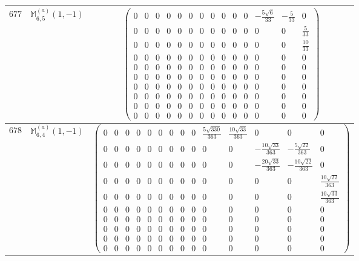 \documentclass[fleqn,8pt,landscape]{jsarticle}
\begin{document}
\begin{center}
\begin{longtable}{ccc}
$ 677 $ & $ \mathbb{M}_{6,5}^{(a)}(1,-1) $ & $ \begin{pmatrix} 0 & 0 & 0 & 0 & 0 & 0 & 0 & 0 & 0 & 0 & 0 & - \frac{5 \sqrt{6}}{33} & - \frac{5}{33} & 0 \\ 0 & 0 & 0 & 0 & 0 & 0 & 0 & 0 & 0 & 0 & 0 & 0 & 0 & \frac{5}{33} \\ 0 & 0 & 0 & 0 & 0 & 0 & 0 & 0 & 0 & 0 & 0 & 0 & 0 & \frac{10}{33} \\ 0 & 0 & 0 & 0 & 0 & 0 & 0 & 0 & 0 & 0 & 0 & 0 & 0 & 0 \\ 0 & 0 & 0 & 0 & 0 & 0 & 0 & 0 & 0 & 0 & 0 & 0 & 0 & 0 \\ 0 & 0 & 0 & 0 & 0 & 0 & 0 & 0 & 0 & 0 & 0 & 0 & 0 & 0 \\ 0 & 0 & 0 & 0 & 0 & 0 & 0 & 0 & 0 & 0 & 0 & 0 & 0 & 0 \\ 0 & 0 & 0 & 0 & 0 & 0 & 0 & 0 & 0 & 0 & 0 & 0 & 0 & 0 \\ 0 & 0 & 0 & 0 & 0 & 0 & 0 & 0 & 0 & 0 & 0 & 0 & 0 & 0 \\ 0 & 0 & 0 & 0 & 0 & 0 & 0 & 0 & 0 & 0 & 0 & 0 & 0 & 0 \end{pmatrix} $ \\ \hline
$ 678 $ & $ \mathbb{M}_{6,4}^{(a)}(1,-1) $ & $ \begin{pmatrix} 0 & 0 & 0 & 0 & 0 & 0 & 0 & 0 & 0 & \frac{5 \sqrt{330}}{363} & \frac{10 \sqrt{33}}{363} & 0 & 0 & 0 \\ 0 & 0 & 0 & 0 & 0 & 0 & 0 & 0 & 0 & 0 & 0 & - \frac{10 \sqrt{33}}{363} & - \frac{5 \sqrt{22}}{363} & 0 \\ 0 & 0 & 0 & 0 & 0 & 0 & 0 & 0 & 0 & 0 & 0 & - \frac{20 \sqrt{33}}{363} & - \frac{10 \sqrt{22}}{363} & 0 \\ 0 & 0 & 0 & 0 & 0 & 0 & 0 & 0 & 0 & 0 & 0 & 0 & 0 & \frac{10 \sqrt{22}}{363} \\ 0 & 0 & 0 & 0 & 0 & 0 & 0 & 0 & 0 & 0 & 0 & 0 & 0 & \frac{10 \sqrt{33}}{363} \\ 0 & 0 & 0 & 0 & 0 & 0 & 0 & 0 & 0 & 0 & 0 & 0 & 0 & 0 \\ 0 & 0 & 0 & 0 & 0 & 0 & 0 & 0 & 0 & 0 & 0 & 0 & 0 & 0 \\ 0 & 0 & 0 & 0 & 0 & 0 & 0 & 0 & 0 & 0 & 0 & 0 & 0 & 0 \\ 0 & 0 & 0 & 0 & 0 & 0 & 0 & 0 & 0 & 0 & 0 & 0 & 0 & 0 \\ 0 & 0 & 0 & 0 & 0 & 0 & 0 & 0 & 0 & 0 & 0 & 0 & 0 & 0 \end{pmatrix} $ \\ \hline

\end{longtable}
\end{center}
\end{document}
